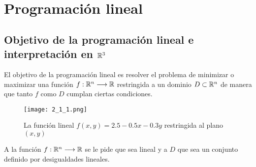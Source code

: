 \chapter{Programación lineal}

\section{Objetivo de la programación lineal e interpretación en $\mathbb R^3$}
El objetivo de la programación lineal es resolver el problema de
minimizar o maximizar una función $f:\mathbb R^n\longrightarrow\mathbb R$
restringida a un dominio $D\subset\mathbb R^n$ de manera que tanto $f$ como
$D$ cumplan ciertas condiciones.

\begin{figure}[h]
  \caption{La función lineal $f(x,y)=2.5 - 0.5 x - 0.3 y$ restringida al plano $(x, y)$}
  \centering
  \texttt{[image: 2\_1\_1.png]}
\end{figure}

A la función $f:\mathbb R^n\longrightarrow\mathbb R$ se le pide que sea lineal y a $D$ que sea un conjunto definido por desigualdades lineales.
